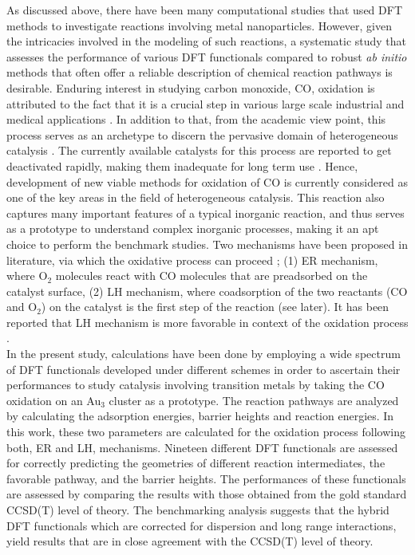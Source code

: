 As discussed above, there have been many computational studies that used DFT methods to investigate reactions involving metal nanoparticles. However, given the intricacies involved in the modeling of such reactions, a systematic study that assesses the performance of various DFT functionals compared to robust \textit{ab initio} methods that often offer a reliable description of chemical reaction pathways is desirable. Enduring interest in studying carbon monoxide, CO, oxidation is attributed to the fact that it is a crucial step in various large scale industrial and medical applications \cite{xie_2009,freund2011}. In addition to that, from the academic view point, this process serves as an archetype to discern the pervasive domain of heterogeneous catalysis \cite{freund2011}. The currently available catalysts for this process are reported to get deactivated rapidly, making them inadequate for long term use \cite{xie_2009}. Hence, development of new viable methods for oxidation of CO is currently considered as one of the key areas in the field of heterogeneous catalysis. This reaction also captures many important features of a typical inorganic reaction, and thus serves as a prototype to understand complex inorganic processes, making it an apt choice to perform the benchmark studies. Two mechanisms have been proposed in literature, via which the oxidative process can proceed \cite{zhang2007,lopez2002,mavrikakis2003,liu2002,liu2003}; (1) ER mechanism, where O$_2$ molecules react with CO molecules that are preadsorbed on the catalyst surface, (2) LH mechanism, where coadsorption of the two reactants (CO and O$_2$) on the catalyst is the first step of the reaction (see later). It has been reported that LH mechanism is more favorable in context of the oxidation process \cite{zhang2007,Gruene2008,Olga2010,Jena2012}. \\
In the present study, calculations have been done by employing a wide spectrum of DFT functionals developed under different schemes in order to ascertain their performances to study catalysis involving transition metals by taking the CO oxidation on an Au$_{3}$ cluster as a prototype. The reaction pathways are analyzed by calculating the adsorption energies, barrier heights and reaction energies. In this work, these two parameters are calculated for the oxidation process following both, ER and LH, mechanisms. Nineteen different DFT functionals are assessed for correctly predicting the geometries of different reaction intermediates, the favorable pathway, and the barrier heights. The performances of these functionals are assessed by comparing the results with those obtained from the gold standard CCSD(T) level of theory. The benchmarking analysis suggests that the hybrid DFT functionals which are corrected for dispersion and long range interactions, yield results that are in close agreement with the CCSD(T) level of theory.

